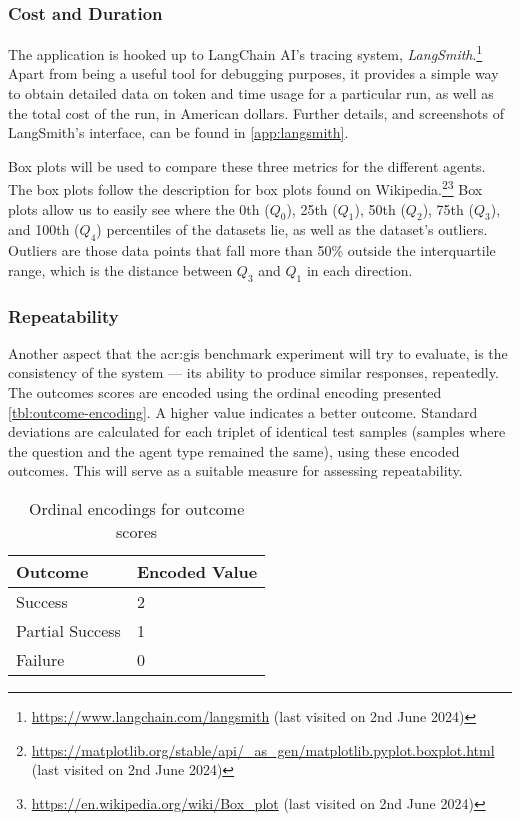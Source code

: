 \subsubsection{Cost and Duration}
\label{subsubsec:cost-and-duration}

The application is hooked up to LangChain AI's tracing system, \textit{LangSmith}.\footnote{\url{https://www.langchain.com/langsmith} (last visited on 2nd June 2024)} Apart from being a useful tool for debugging purposes, it provides a simple way to obtain detailed data on token and time usage for a particular run, as well as the total cost of the run, in American dollars. Further details, and screenshots of LangSmith's interface, can be found in \autoref{app:langsmith}.

Box plots will be used to compare these three metrics for the different agents. The box plots follow the description for box plots found on Wikipedia.\footnote{\url{https://matplotlib.org/stable/api/_as_gen/matplotlib.pyplot.boxplot.html} (last visited on 2nd June 2024)}\footnote{\url{https://en.wikipedia.org/wiki/Box_plot} (last visited on 2nd June 2024)} Box plots allow us to easily see where the 0th ($Q_0$), 25th ($Q_1$), 50th ($Q_2$), 75th ($Q_3$), and 100th ($Q_4$) percentiles of the datasets lie, as well as the dataset's outliers. Outliers are those data points that fall more than 50\% outside the interquartile range, which is the distance between $Q_3$ and $Q_1$ in each direction.

\subsubsection{Repeatability}
\label{subsubsec:repeatability}

Another aspect that the \acrshort{acr:gis} benchmark experiment will try to evaluate, is the consistency of the system --- its ability to produce similar responses, repeatedly. The outcomes scores are encoded using the ordinal encoding presented \autoref{tbl:outcome-encoding}. A higher value indicates a better outcome. Standard deviations are calculated for each triplet of identical test samples (samples where the question and the agent type remained the same), using these encoded outcomes. This will serve as a suitable measure for assessing repeatability.

\begin{table}[htbp]
    \centering
    \caption{Ordinal encodings for outcome scores}
    \label{tbl:outcome-encoding}
    \begin{tabularx}{0.5\textwidth}{XX}
        \toprule
        \textbf{Outcome} & \textbf{Encoded Value} \\
        \midrule
        Success          & 2                      \\
        Partial Success  & 1                      \\
        Failure          & 0                      \\
        \bottomrule
    \end{tabularx}
\end{table}



